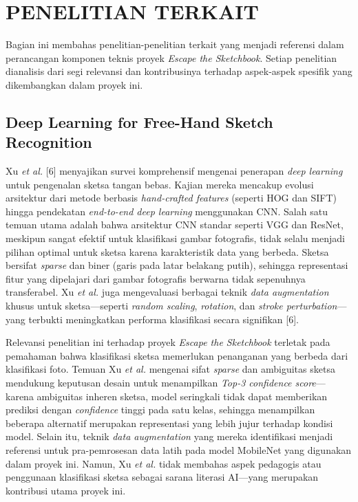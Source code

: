 \documentclass[10pt,twoside,openright]{report}
\begin{document}
\section{PENELITIAN TERKAIT}
\label{sec:penelitian-terkait}

Bagian ini membahas penelitian-penelitian terkait yang menjadi referensi dalam perancangan komponen teknis proyek \textit{Escape the Sketchbook}. Setiap penelitian dianalisis dari segi relevansi dan kontribusinya terhadap aspek-aspek spesifik yang dikembangkan dalam proyek ini.

\subsection{Deep Learning for Free-Hand Sketch Recognition}
\label{subsec:penelitian-sketch}

Xu \textit{et al.} [6] menyajikan survei komprehensif mengenai penerapan \textit{deep learning} untuk pengenalan sketsa tangan bebas. Kajian mereka mencakup evolusi arsitektur dari metode berbasis \textit{hand-crafted features} (seperti HOG dan SIFT) hingga pendekatan \textit{end-to-end deep learning} menggunakan CNN. Salah satu temuan utama adalah bahwa arsitektur CNN standar seperti VGG dan ResNet, meskipun sangat efektif untuk klasifikasi gambar fotografis, tidak selalu menjadi pilihan optimal untuk sketsa karena karakteristik data yang berbeda. Sketsa bersifat \textit{sparse} dan biner (garis pada latar belakang putih), sehingga representasi fitur yang dipelajari dari gambar fotografis berwarna tidak sepenuhnya transferabel. Xu \textit{et al.} juga mengevaluasi berbagai teknik \textit{data augmentation} khusus untuk sketsa—seperti \textit{random scaling}, \textit{rotation}, dan \textit{stroke perturbation}—yang terbukti meningkatkan performa klasifikasi secara signifikan [6].

Relevansi penelitian ini terhadap proyek \textit{Escape the Sketchbook} terletak pada pemahaman bahwa klasifikasi sketsa memerlukan penanganan yang berbeda dari klasifikasi foto. Temuan Xu \textit{et al.} mengenai sifat \textit{sparse} dan ambiguitas sketsa mendukung keputusan desain untuk menampilkan \textit{Top-3 confidence score}—karena ambiguitas inheren sketsa, model seringkali tidak dapat memberikan prediksi dengan \textit{confidence} tinggi pada satu kelas, sehingga menampilkan beberapa alternatif merupakan representasi yang lebih jujur terhadap kondisi model. Selain itu, teknik \textit{data augmentation} yang mereka identifikasi menjadi referensi untuk pra-pemrosesan data latih pada model MobileNet yang digunakan dalam proyek ini. Namun, Xu \textit{et al.} tidak membahas aspek pedagogis atau penggunaan klasifikasi sketsa sebagai sarana literasi AI—yang merupakan kontribusi utama proyek ini.
\end{document}
